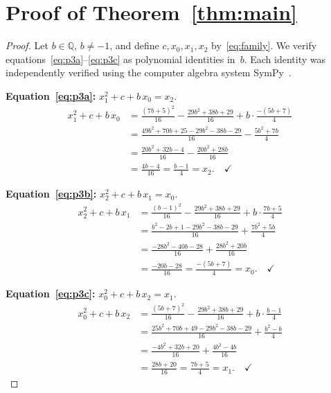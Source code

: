 \documentclass[11pt]{article}
\theoremstyle{definition}
\theoremstyle{remark}
\begin{document}
\section{Proof of Theorem~\ref{thm:main}}
\label{sec:main}

\begin{proof}
  Let $b \in \mathbb{Q}$, $b \neq -1$, and define $c, x_0, x_1, x_2$
  by~\eqref{eq:family}.  We verify
  equations~\eqref{eq:p3a}--\eqref{eq:p3c} as polynomial identities in~$b$.
  Each identity was independently verified using the computer algebra system
  SymPy~\cite{sympy}.

  \smallskip\noindent\textbf{Equation~\eqref{eq:p3a}:}
  $x_1^2 + c + b\,x_0 = x_2$.
  \begin{align*}
    x_1^2 + c + b\,x_0
    &= \frac{(7b+5)^2}{16} - \frac{29b^2+38b+29}{16} + b\!\cdot\!\frac{-(5b+7)}{4} \\[4pt]
    &= \frac{49b^2+70b+25 - 29b^2-38b-29}{16} - \frac{5b^2+7b}{4} \\[4pt]
    &= \frac{20b^2+32b-4}{16} - \frac{20b^2+28b}{16} \\[4pt]
    &= \frac{4b-4}{16} = \frac{b-1}{4} = x_2. \quad \checkmark
  \end{align*}

  \smallskip\noindent\textbf{Equation~\eqref{eq:p3b}:}
  $x_2^2 + c + b\,x_1 = x_0$.
  \begin{align*}
    x_2^2 + c + b\,x_1
    &= \frac{(b-1)^2}{16} - \frac{29b^2+38b+29}{16} + b\!\cdot\!\frac{7b+5}{4} \\[4pt]
    &= \frac{b^2-2b+1-29b^2-38b-29}{16} + \frac{7b^2+5b}{4} \\[4pt]
    &= \frac{-28b^2-40b-28}{16} + \frac{28b^2+20b}{16} \\[4pt]
    &= \frac{-20b-28}{16} = \frac{-(5b+7)}{4} = x_0. \quad \checkmark
  \end{align*}

  \smallskip\noindent\textbf{Equation~\eqref{eq:p3c}:}
  $x_0^2 + c + b\,x_2 = x_1$.
  \begin{align*}
    x_0^2 + c + b\,x_2
    &= \frac{(5b+7)^2}{16} - \frac{29b^2+38b+29}{16} + b\!\cdot\!\frac{b-1}{4} \\[4pt]
    &= \frac{25b^2+70b+49 - 29b^2-38b-29}{16} + \frac{b^2-b}{4} \\[4pt]
    &= \frac{-4b^2+32b+20}{16} + \frac{4b^2-4b}{16} \\[4pt]
    &= \frac{28b+20}{16} = \frac{7b+5}{4} = x_1. \quad \checkmark
  \end{align*}


\end{proof}
\end{document}
